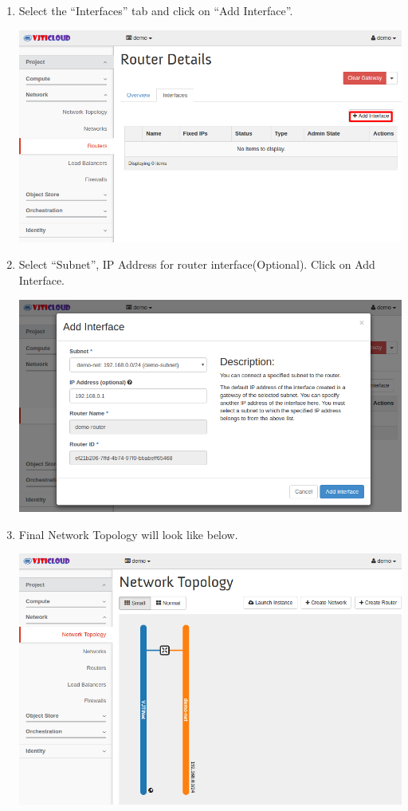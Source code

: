 \documentclass[letterpaper,10pt,english]{sphinxmanual}
\begin{document}
\begin{enumerate}
\item {} 
Select the ``Interfaces'' tab and click on ``Add Interface''.

\includegraphics{nt-router-details.png}

\item {} 
Select ``Subnet'', IP Address for router interface(Optional). Click on Add Interface.

\includegraphics{nt-router-add-interface.png}

\item {} 
Final Network Topology will look like below.

\includegraphics{nt-network-topology-final.png}

\end{enumerate}
\end{document}

